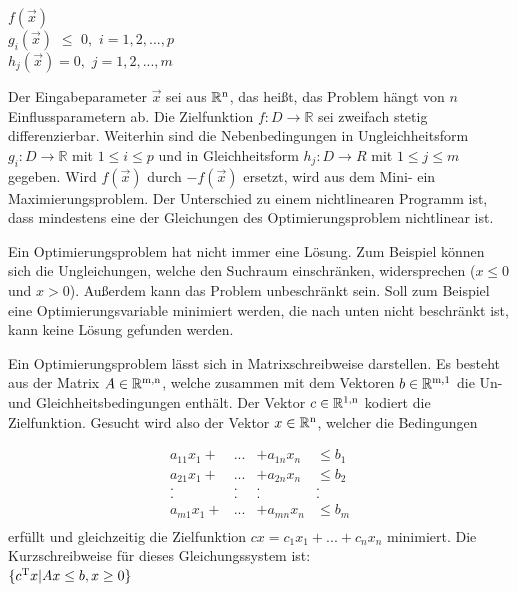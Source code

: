 \documentclass{like}
\begin{document}
\noindent\hspace*{3mm}%
$f(\vec{x}) $ \\
\noindent\hspace*{3mm}%
$g_i(\vec{x})$ $\leq$ $0,$ $i=1,2,...,p$  \\
\noindent\hspace*{50mm}%
$h_j(\vec{x})= 0,$ $j= 1,2,...,m$\\ 
\noindent\hspace*{50mm}%


Der Eingabeparameter $\vec{x}$ sei aus $\mathbb{R} \textsuperscript{n} $, das heißt, das Problem hängt von \(n\) Einflussparametern ab. Die Zielfunktion $f:D \rightarrow \mathbb{R} $ sei zweifach stetig differenzierbar. Weiterhin sind die Nebenbedingungen in Ungleichheitsform $g_i:D \rightarrow \mathbb{R}$ mit $1\leq i \leq p$ und in Gleichheitsform $h_j:D \rightarrow \!R$ mit $1\leq j \leq m$ gegeben.
Wird \(f(\vec{x})\) durch \(-f(\vec{x})\) ersetzt, wird aus dem Mini- ein Maximierungsproblem. Der Unterschied zu einem nichtlinearen Programm ist, dass mindestens eine der Gleichungen des Optimierungsproblem nichtlinear ist.

Ein Optimierungsproblem hat nicht immer eine Lösung. Zum Beispiel können sich die  Ungleichungen, welche den Suchraum einschränken, widersprechen ($x \leq 0 $ und $x > 0$). Außerdem kann das Problem unbeschränkt sein. Soll zum Beispiel eine Optimierungsvariable minimiert werden, die nach unten nicht beschränkt ist, kann keine Lösung gefunden werden. 

Ein Optimierungsproblem lässt sich in Matrixschreibweise darstellen. Es besteht aus der Matrix $A \in \mathbb{R} \textsuperscript{m,n}$, welche zusammen mit dem Vektoren $b \in \mathbb{R} \textsuperscript{m,1}$ die Un- und Gleichheitsbedingungen enthält. Der Vektor $c \in \mathbb{R} \textsuperscript{1,n}$ kodiert die Zielfunktion. Gesucht wird also der Vektor $x \in \mathbb{R} \textsuperscript{n}$, welcher die Bedingungen

\[  \begin{array}{cccc}
a_{11} x_1 + & ... & + a_{1n} x_n & \leq b_1 \\   	
a_{21} x_1 + & ... & + a_{2n} x_n & \leq b_2 \\ 
. & . & . & . \\
. & . & . & . \\
a_{m1} x_1 + & ... & + a_{mn} x_n & \leq b_m \\
\end{array}\] 
erfüllt und gleichzeitig die Zielfunktion 
$cx=c_1 x_1 + ... + c_n x_n$ minimiert.
Die Kurzschreibweise für dieses Gleichungssystem ist: \\
 $\{ c\textsuperscript{T}x | Ax \leq b, x \geq 0 \}$
\end{document}
